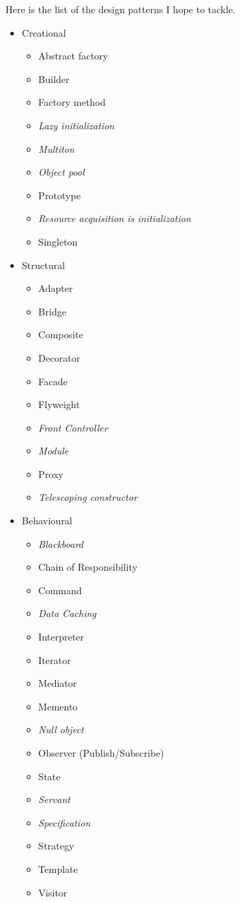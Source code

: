 \documentclass[12pt, oneside]{book} %
\begin{document}
Here is the list of the design patterns I hope to tackle.
\begin{itemize}

\item Creational

\begin{itemize}
\item Abstract factory
\item Builder
\item Factory method
\item \emph{Lazy initialization}
\item \emph{Multiton}
\item \emph{Object pool}
\item Prototype
\item \emph{Resource acquisition is initialization}
\item Singleton
\end{itemize}

\item Structural

\begin{itemize}
\item Adapter
\item Bridge
\item Composite
\item Decorator
\item Facade
\item Flyweight
\item \emph{Front Controller}
\item \emph{Module}
\item Proxy
\item \emph{Telescoping constructor}
\end{itemize}

\item Behavioural

\begin{itemize}
\item \emph{Blackboard}
\item Chain of Responsibility
\item Command
\item \emph{Data Caching}
\item Interpreter
\item Iterator
\item Mediator
\item Memento
\item \emph{Null object}
\item Observer (Publish/Subscribe)
\item State
\item \emph{Servant}
\item \emph{Specification}
\item Strategy
\item Template
\item Visitor
\end{itemize}


\end{itemize}
\end{document}
